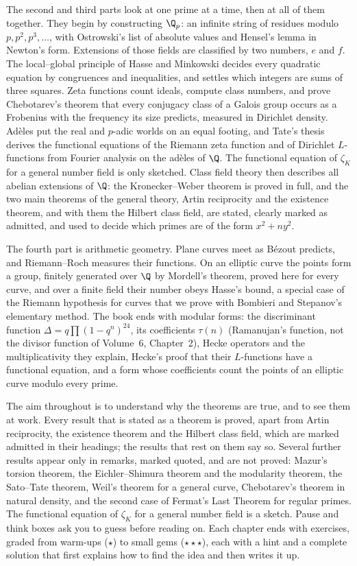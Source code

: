 The second and third parts look at one prime at a time, then at all of them together. They begin by constructing $\Q_p$: an infinite string of residues modulo $p,p^2,p^3,\dots$, with Ostrowski's list of absolute values and Hensel's lemma in Newton's form. Extensions of those fields are
classified by two numbers, $e$ and $f$. The local--global principle of Hasse and Minkowski decides every quadratic
equation by congruences and inequalities, and settles which integers are sums of three squares. Zeta functions count
ideals, compute class numbers, and prove Chebotarev's theorem that every conjugacy class of a Galois group occurs as a
Frobenius with the frequency its size predicts, measured in Dirichlet density. Ad\`eles put the real and $p$-adic worlds on an equal footing, and
Tate's thesis derives the functional equations of the Riemann zeta function and of Dirichlet $L$-functions from Fourier analysis on the ad\`eles of $\Q$. The functional equation of $\zeta_K$ for a general number field is only sketched. Class field theory
then describes all abelian extensions of $\Q$: the Kronecker--Weber theorem is proved in full, and the two main theorems
of the general theory, Artin reciprocity and the existence theorem, and with them the Hilbert class field, are stated,
clearly marked as admitted, and used to decide which primes are of the form $x^2+ny^2$.

The fourth part is arithmetic geometry. Plane curves meet as Bézout predicts, and Riemann--Roch measures their functions.
On an elliptic curve the points form a group, finitely generated over $\Q$ by Mordell's theorem, proved here for every curve, and over a
finite field their number obeys Hasse's bound, a special case of the Riemann hypothesis for curves that we prove with
Bombieri and Stepanov's elementary method. The book ends with modular forms: the discriminant function
$\Delta=q\prod(1-q^n)^{24}$, its coefficients $\tau(n)$ (Ramanujan's function, not the divisor function of Volume~6, Chapter~2), Hecke operators and the multiplicativity they explain,
Hecke's proof that their $L$-functions have a functional equation, and a form whose coefficients count the points of an
elliptic curve modulo every prime.

The aim throughout is to understand why the theorems are true, and to see them at work. Every result that is stated as a theorem is proved, apart from Artin reciprocity, the existence theorem and the Hilbert class field, which are marked admitted in their headings; the results that rest on them say so. Several further results appear only in remarks, marked quoted, and are not proved: Mazur's torsion theorem, the Eichler--Shimura theorem and the modularity theorem, the Sato--Tate theorem, Weil's theorem for a general curve, Chebotarev's theorem in natural density, and the second case of Fermat's Last Theorem for regular primes. The functional equation of $\zeta_K$ for a general number field is a sketch. Pause
and think boxes ask you to guess before reading on. Each chapter ends with exercises, graded from warm-ups
($\star$) to small gems ($\star\star\star$), each with a hint and a complete solution that first explains how to find
the idea and then writes it up.

